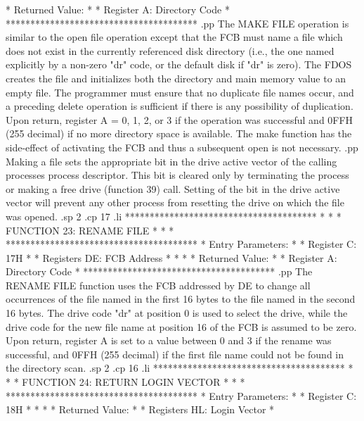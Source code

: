 *  Returned   Value:                  *
*      Register   A:  Directory Code  *
***************************************
.pp
The MAKE FILE operation is similar to the open file operation
except that the FCB must name a file which does not exist
in the currently referenced disk directory (i.e., the one
named explicitly by a non-zero "dr" code, or the default
disk if "dr" is zero).  The FDOS creates the file and initializes
both the directory and main memory value to an empty file.
The programmer must ensure that no duplicate file names
occur, and a preceding delete operation is sufficient if
there is any possibility of duplication.
Upon return, register A = 0, 1, 2, or 3 if the operation
was successful and 0FFH (255 decimal) if no more directory
space is available.  The make function has the side-effect
of activating the FCB and thus a subsequent open is not
necessary.
.pp
Making a file sets the appropriate bit in the drive active vector
of the calling processes process descriptor.  This bit is cleared
only by terminating the process or making a free drive (function 39)
call.  Setting of the bit in the drive active vector will prevent
any other process from resetting the drive on which the file was
opened.
.sp 2
.cp 17
.li
***************************************
*                                     *
*  FUNCTION 23: RENAME FILE           *
*                                     *
***************************************
*  Entry Parameters:                  *
*      Register   C:  17H             *
*      Registers DE:  FCB Address     *
*                                     *
*  Returned   Value:                  *
*      Register   A:  Directory Code  *
***************************************
.pp
The RENAME FILE function uses the FCB addressed by DE to change
all occurrences of the file named in the first 16 bytes
to the file named in the second 16 bytes.  The drive code
"dr" at position 0 is used to select the drive, while the
drive code for the new file name at position 16 of the
FCB is assumed to be zero.  Upon return, register A is
set to a value between 0 and 3 if the rename was successful,
and 0FFH (255 decimal) if the first file name could not
be found in the directory scan.
.sp 2
.cp 16
.li
***************************************
*                                     *
*  FUNCTION 24: RETURN LOGIN VECTOR   *
*                                     *
***************************************
*  Entry Parameters:                  *
*      Register   C:  18H             *
*                                     *
*  Returned   Value:                  *
*      Registers HL:  Login Vector    *
